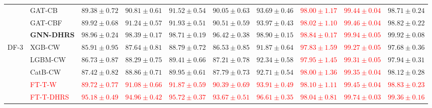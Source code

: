 \documentclass[pdflatex,sn-mathphys-num]{sn-jnl}%
\theoremstyle{thmstyleone}%
\theoremstyle{thmstyletwo}%
\theoremstyle{thmstylethree}%
\begin{document}
\begin{table}[!ht]
{\begin{tabular}{@{}llcccccccc@{}}
& GAT-CB
& $89.38\pm0.72$
& $90.81\pm0.61$
& $91.52\pm0.54$
& $90.05\pm0.63$
& $93.69\pm0.46$
& \textcolor{red}{$98.00\pm1.17$}
& \textcolor{red}{$99.44\pm0.04$}
& $98.71\pm0.24$ \\

& GAT-CBF
& $89.92\pm0.68$
& $91.24\pm0.57$
& $91.93\pm0.51$
& $90.51\pm0.59$
& $93.97\pm0.43$
& \textcolor{red}{$98.02\pm1.10$}
& \textcolor{red}{$99.46\pm0.04$}
& $98.82\pm0.22$ \\

& \textbf{GNN-DHRS}
& \textbf{$98.96\pm0.24$}
& \textbf{$98.39\pm0.17$}
& \textbf{$98.71\pm0.19$}
& \textbf{$96.42\pm0.38$}
& \textbf{$98.90\pm0.15$}
& \textcolor{red}{\textbf{$98.84\pm0.17$}}
& \textcolor{red}{\textbf{$99.94\pm0.05$}}
& \textbf{$99.92\pm0.08$} \\

\midrule

\multirow{13}{*}{DF-3}

& XGB-CW
& $85.91\pm0.95$
& $87.64\pm0.81$
& $88.79\pm0.72$
& $86.53\pm0.85$
& $91.87\pm0.64$
& \textcolor{red}{$97.83\pm1.59$}
& \textcolor{red}{$99.27\pm0.05$}
& $97.68\pm0.36$ \\

& LGBM-CW
& $86.73\pm0.87$
& $88.29\pm0.75$
& $89.41\pm0.66$
& $87.21\pm0.78$
& $92.34\pm0.58$
& \textcolor{red}{$97.95\pm1.45$}
& \textcolor{red}{$99.31\pm0.05$}
& $97.94\pm0.31$ \\

& CatB-CW
& $87.42\pm0.82$
& $88.86\pm0.71$
& $89.95\pm0.61$
& $87.79\pm0.73$
& $92.71\pm0.54$
& \textcolor{red}{$98.00\pm1.36$}
& \textcolor{red}{$99.35\pm0.04$}
& $98.12\pm0.28$ \\


& \textcolor{red}{FT-T-W}
& \textcolor{red}{$89.72\pm0.77$}
& \textcolor{red}{$91.08\pm0.66$}
& \textcolor{red}{$91.87\pm0.59$}
& \textcolor{red}{$90.39\pm0.69$}
& \textcolor{red}{$93.91\pm0.49$}
& \textcolor{red}{$98.10\pm1.11$}
& \textcolor{red}{$99.45\pm0.04$}
& \textcolor{red}{$98.83\pm0.23$} \\

& \textcolor{red}{FT-T-DHRS}
& \textcolor{red}{$95.18\pm0.49$}
& \textcolor{red}{$94.96\pm0.42$}
& \textcolor{red}{$95.72\pm0.37$}
& \textcolor{red}{$93.67\pm0.51$}
& \textcolor{red}{$96.61\pm0.35$}
& \textcolor{red}{$98.04\pm0.81$}
& \textcolor{red}{$99.74\pm0.03$}
& \textcolor{red}{$99.36\pm0.16$} \\


\end{tabular}}
\end{table}
\end{document}
